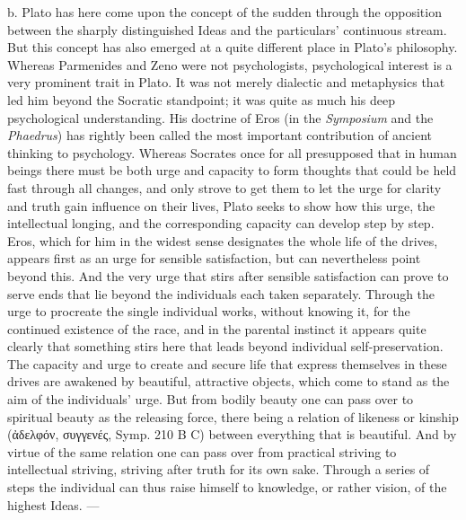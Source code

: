 \documentclass[12pt,a4paper,openany]{book}
\newcommand{\opage}[1]{\marginnote{\footnotesize\textit{[#1]}}}
\begin{document}
b. Plato has here come upon the concept of the sudden through
the opposition between the sharply distinguished Ideas and the
\setcounter{footnote}{0}%
\opage{44}particulars' continuous stream.  But this concept has also emerged at a quite different place
in Plato's philosophy.  Whereas
Parmenides and Zeno were not psychologists,
psychological interest is a very prominent trait in Plato.  It was
not merely dialectic and metaphysics that led him beyond
the Socratic standpoint; it was quite as much
his deep psychological understanding.  His doctrine of Eros (in the
\textit{Symposium} and the \textit{Phaedrus}) has rightly been called the
most important contribution of ancient thinking to psychology.  Whereas
Socrates once for all presupposed that in human beings there
must be both urge and capacity to form thoughts
that could be held fast through all changes, and only strove
to get them to let the urge for clarity
and truth gain influence on their lives, Plato seeks to
show how this urge, the intellectual longing, and
the corresponding capacity can develop step by step.
Eros, which for him in the widest sense designates the whole life of the drives,
appears first as an urge for sensible satisfaction,
but can nevertheless point beyond this.  And the very urge
that stirs after sensible satisfaction can prove to
serve ends that lie beyond the individuals each
taken separately.  Through the urge to procreate the single
individual works, without knowing it, for the continued existence of the race, and in the parental instinct
it appears quite clearly that something stirs here
that leads beyond individual self-preservation.  The
capacity and urge to create and secure life that express themselves in
these drives are awakened by beautiful, attractive objects, which
come to stand as the aim of the individuals' urge.
But from bodily beauty one can pass over to spiritual
beauty as the releasing force, there being a relation of likeness or
kinship (ἀδελφόν, συγγενές, Symp. 210 B C) between
everything that is beautiful.  And by virtue of the same relation
\setcounter{footnote}{0}%
\opage{45}one can pass over from practical striving to intellectual
striving, striving after truth for its own sake.
Through a series of steps the individual can thus raise
himself to knowledge, or rather vision, of the highest Ideas. ---
\end{document}
